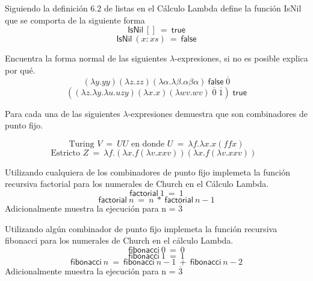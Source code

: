                 \begin{exercise}
                    Siguiendo la definición 6.2 de listas en el Cálculo Lambda define la función \textsf{IsNil} que se comporta de la siguiente forma
                    \[ \textsf{IsNil}\ []\ =\ \textsf{true} \]
                    \[ \textsf{IsNil}\ (x:xs)\  =\ \textsf{false}\]
                \end{exercise}


                \begin{exercise}
                    Encuentra la forma normal de las siguientes $\lambda$-expresiones, si no es posible explica por qué.\\
                    \[
                        (\lambda y.yy)(\lambda z.zz)(\lambda \alpha . \lambda \beta . \alpha \beta \alpha)\ \textsf{false} \; \overline{0}
                    \]
                    \[
                        ((\lambda z. \lambda y. \lambda u.uzy)(\lambda x.x)(\lambda wv.wv) \; \overline{0} \; \overline{1}) \; \textsf{true} 
                    \]
                \end{exercise}


                \begin{exercise}
                    Para cada una de las siguientes $\lambda$-expresiones demuestra que son combinadores de punto fijo.
                    

                        \[\text{Turing $V\ =\ UU$ en donde $U\ =\ \lambda f.\lambda x.x(ffx)$}\]
                        \[\text{Estricto $Z\ =\ \lambda f.(\lambda x.f(\lambda v.xxv))(\lambda x.f(\lambda v.xxv))$ }\]
            
                    
                \end{exercise}



                \begin{exercise}
                    Utilizando cualquiera de los combinadores de punto fijo implemeta la función recursiva \textsf{factorial} para los numerales de Church en el Cálculo Lambda.
                    \[ \textsf{factorial}\ 1\ =\ 1 \]
                    \[ \textsf{factorial}\ n\ =\ n\ *\ \textsf{factorial}\ n-1\]
                    Adicionalmente muestra la ejecución para n = $\overline{3}$
                \end{exercise}



                \begin{exercise}
                    Utilizando algún combinador de punto fijo implemeta la función recursiva \textsf{fibonacci} para los numerales de Church en el cálculo Lambda.
                    \[ \textsf{fibonacci}\ 0\ =\ 0 \]
                    \[ \textsf{fibonacci}\ 1\ =\ 1 \]
                    \[ \textsf{fibonacci}\ n\ =\ \textsf{fibonacci}\ n-1\ +\ \textsf{fibonacci}\ n-2\]
                    Adicionalmente muestra la ejecución para n = $\overline{3}$
                \end{exercise}


